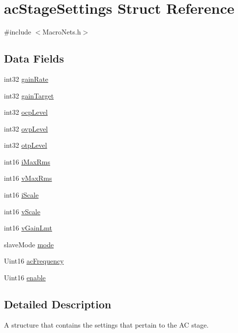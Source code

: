 \hypertarget{a00004}{\section{ac\-Stage\-Settings Struct Reference}
\label{a00004}
}


{\ttfamily \#include $<$Macro\-Nets.\-h$>$}

\subsection*{Data Fields}
\begin{DoxyCompactItemize}
\item 
int32 \hyperlink{a00004_a79680d88a9281cf5f6705881261b65db}{gain\-Rate}
\item 
int32 \hyperlink{a00004_af2ee8eeee892bf7f43e53bffdfa9993b}{gain\-Target}
\item 
int32 \hyperlink{a00004_a96fd85bb29c3f2ce0515eedbc353cd9f}{ocp\-Level}
\item 
int32 \hyperlink{a00004_a8b5f24f22b2b5c641cb4b81d27a13ff7}{ovp\-Level}
\item 
int32 \hyperlink{a00004_a650064b66038e3805f5bd42459d01bb4}{otp\-Level}
\item 
int16 \hyperlink{a00004_a9a07b0fd154720204a362df5217d2079}{i\-Max\-Rms}
\item 
int16 \hyperlink{a00004_ada3ef104bd8a8b682745bff081ec5ad7}{v\-Max\-Rms}
\item 
int16 \hyperlink{a00004_ade324e2ab9ea9a6d3620cf7028cc4c1d}{i\-Scale}
\item 
int16 \hyperlink{a00004_ad5f818e5589d223d11291bce3a7b3089}{v\-Scale}
\item 
int16 \hyperlink{a00004_ae3baa80fd1636154afd892c7362ca82c}{v\-Gain\-Lmt}
\item 
slave\-Mode \hyperlink{a00004_a3cb6e49a13279ff6c21dfdb9ee7f2f83}{mode}
\item 
Uint16 \hyperlink{a00004_a87713ff5f537563733a303ba762fdeb5}{ac\-Frequency}
\item 
Uint16 \hyperlink{a00004_a77d8744d531e699816cfcff31ccb6360}{enable}
\end{DoxyCompactItemize}


\subsection{Detailed Description}
A structure that contains the settings that pertain to the A\-C stage. 

